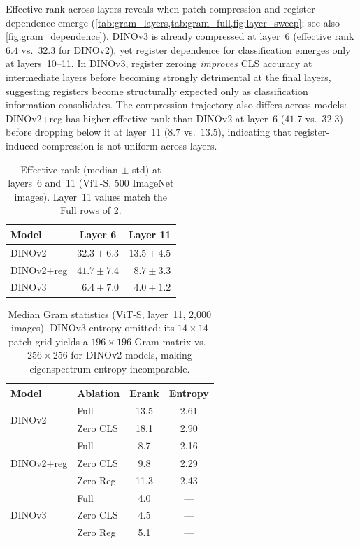 \documentclass[10pt,twocolumn,letterpaper]{article}
\begin{document}
Effective rank across layers reveals when patch compression and register dependence emerge (\cref{tab:gram_layers,tab:gram_full,fig:layer_sweep}; see also \cref{fig:gram_dependence}).
DINOv3 is already compressed at layer~6 (effective rank $6.4$ vs.\ $32.3$ for DINOv2), yet register dependence for classification emerges only at layers~10--11.
In DINOv3, register zeroing \emph{improves} CLS accuracy at intermediate layers before becoming strongly detrimental at the final layers, suggesting registers become structurally expected only as classification information consolidates.
The compression trajectory also differs across models: DINOv2+reg has higher effective rank than DINOv2 at layer~6 ($41.7$ vs.\ $32.3$) before dropping below it at layer~11 ($8.7$ vs.\ $13.5$), indicating that register-induced compression is not uniform across layers.

\begin{table}[b]
\centering
\caption{Effective rank (median $\pm$ std) at layers~6 and~11
(ViT-S, 500 ImageNet images).
Layer~11 values match the Full rows of \cref{tab:gram_full}.}
\label{tab:gram_layers}
\small
\begin{tabular}{@{}lcc@{}}
\toprule
Model & Layer 6 & Layer 11 \\
\midrule
DINOv2     & $32.3 \pm 6.3$  & $13.5 \pm 4.5$ \\
DINOv2+reg & $41.7 \pm 7.4$  & $\phantom{0}8.7 \pm 3.3$ \\
DINOv3     & $\phantom{0}6.4 \pm 7.0$  & $\phantom{0}4.0 \pm 1.2$ \\
\bottomrule
\end{tabular}
\end{table}

\begin{table}[t]
\centering
\caption{Median Gram statistics (ViT-S, layer~11, 2{,}000 images).
DINOv3 entropy omitted: its $14{\times}14$ patch grid yields a
$196{\times}196$ Gram matrix vs.\ $256{\times}256$ for DINOv2 models,
making eigenspectrum entropy incomparable.}
\label{tab:gram_full}
\small
\begin{tabular}{@{}llcc@{}}
\toprule
Model & Ablation & Erank & Entropy \\
\midrule
\multirow{2}{*}{DINOv2}
  & Full     & 13.5 & 2.61 \\
  & Zero CLS & 18.1 & 2.90 \\
\midrule
\multirow{3}{*}{DINOv2+reg}
  & Full     & \phantom{0}8.7 & 2.16 \\
  & Zero CLS & \phantom{0}9.8 & 2.29 \\
  & Zero Reg & 11.3 & 2.43 \\
\midrule
\multirow{3}{*}{DINOv3}
  & Full     & \phantom{0}4.0 & --- \\
  & Zero CLS & \phantom{0}4.5 & --- \\
  & Zero Reg & \phantom{0}5.1 & --- \\
\bottomrule
\end{tabular}
\end{table}
\end{document}
